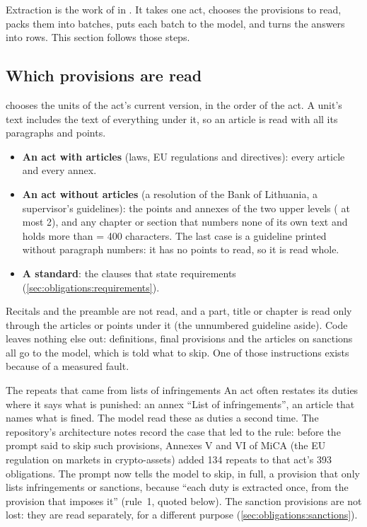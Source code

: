Extraction is the work of  in . It
takes one act, chooses the provisions to read, packs them into batches, puts each batch to the
model, and turns the answers into rows. This section follows those steps.

\subsection{Which provisions are read}

 chooses the units of the act's current version, in the order of the act.
A unit's text includes the text of everything under it, so an article is read with all its
paragraphs and points.

\begin{itemize}
  \item \textbf{An act with articles} (laws, EU regulations and directives): every article and
    every annex.
  \item \textbf{An act without articles} (a resolution of the Bank of Lithuania, a
    supervisor's guidelines): the points and annexes of the two upper levels
    ( at most 2), and any chapter or section that numbers none of its own text
    and holds more than  = 400 characters. The last case is a guideline
    printed without paragraph numbers: it has no points to read, so it is read whole.
  \item \textbf{A standard}: the clauses that state requirements
    (\cref{sec:obligations:requirements}).
\end{itemize}

Recitals and the preamble are not read, and a part, title or chapter is read only through the
articles or points under it (the unnumbered guideline aside). Code leaves nothing else out: definitions, final provisions and the articles on
sanctions all go to the model, which is told what to skip. One of those instructions exists
because of a measured fault.

\begin{lessonbox}{The repeats that came from lists of infringements}
An act often restates its duties where it says what is punished: an annex \enquote{List of
infringements}, an article that names what is fined. The model read these as duties a second
time. The repository's architecture notes record the case that led to the rule: before the
prompt said to skip such provisions, Annexes V and VI of MiCA (the EU regulation on markets in
crypto-assets) added 134 repeats to that act's 393 obligations. The prompt now tells the model
to skip, in full, a provision that only lists infringements or sanctions, because \enquote{each
duty is extracted once, from the provision that imposes it} (rule~1, quoted below). The
sanction provisions are not lost: they are read separately, for a different purpose
(\cref{sec:obligations:sanctions}).
\end{lessonbox}


